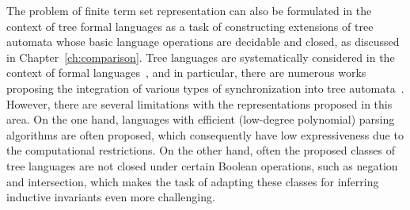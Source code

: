 The problem of finite term set representation can also be formulated in the context of tree formal languages as a task of constructing extensions of tree automata whose basic language operations are decidable and closed, as discussed in Chapter~\ref{ch:comparison}. Tree languages are systematically considered in the context of formal languages~\cite{10.5555/267871}, and in particular, there are numerous works proposing the integration of various types of synchronization into tree automata~\cite{chabin2007visibly, gouranton2001synchronized, limet2001weakly, chabin2006synchronized, jacquemard2009rigid, engelfriet2017multiple}. However, there are several limitations with the representations proposed in this area. On the one hand, languages with efficient (low-degree polynomial) parsing algorithms are often proposed, which consequently have low expressiveness due to the computational restrictions. On the other hand, often the proposed classes of tree languages are not closed under certain Boolean operations, such as negation and intersection, which makes the task of adapting these classes for inferring inductive invariants even more challenging.


